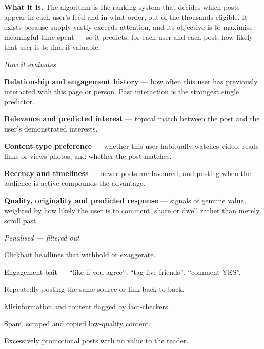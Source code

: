 \begin{qlist}
\textbf{What it is.} The algorithm is the ranking system that decides which
posts appear in each user's feed and in what order, out of the thousands
eligible. It exists because supply vastly exceeds attention, and its objective
is to maximise meaningful time spent --- so it predicts, for each user and each
post, how likely that user is to find it valuable.

\textit{How it evaluates}
\begin{apts}
\item \textbf{Relationship and engagement history} --- how often this user has
      previously interacted with this page or person. Past interaction is the
      strongest single predictor.
\item \textbf{Relevance and predicted interest} --- topical match between the
      post and the user's demonstrated interests.
\item \textbf{Content-type preference} --- whether this user habitually watches
      video, reads links or views photos, and whether the post matches.
\item \textbf{Recency and timeliness} --- newer posts are favoured, and
      posting when the audience is active compounds the advantage.
\item \textbf{Quality, originality and predicted response} --- signals of
      genuine value, weighted by how likely the user is to comment, share or
      dwell rather than merely scroll past.
\end{apts}

\textit{Penalised --- filtered out}
\begin{apts}\setcounter{enumi}{5}
\item Clickbait headlines that withhold or exaggerate.
\item Engagement bait --- ``like if you agree'', ``tag five friends'', ``comment
      YES''.
\item Repeatedly posting the same source or link back to back.
\item Misinformation and content flagged by fact-checkers.
\item Spam, scraped and copied low-quality content.
\item Excessively promotional posts with no value to the reader.
\end{apts}


\end{qlist}
